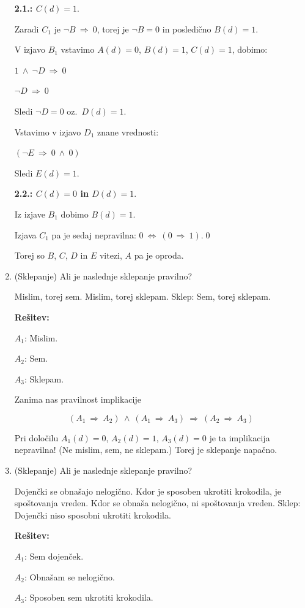 \documentclass[11pt,paper=b5,footinclude,headinclude]{scrbook} %
\def\inn {{~\wedge~}}
\def\sledi {{~\Rightarrow~}}
\def\cee {{~\Leftrightarrow~}}
\theoremstyle{remark}
\theoremstyle{definition} %
\theoremstyle{theorem} %
\begin{document}
\begin{enumerate}
\textbf{2.1.: $C(d) = 1$}.

Zaradi $C_1$ je $\neg B \sledi 0$, torej je $\neg B = 0$ in posledično $B(d) = 1$.

V izjavo $B_1$ vstavimo $A(d) = 0$, $B(d) = 1$, $C(d) = 1$, dobimo:

$1 \inn \neg D\sledi 0$

$\neg D\sledi 0$

Sledi $\neg D = 0$ oz.~$D(d) = 1$.

Vstavimo v izjavo $D_1$ znane vrednosti:

$(\neg E \sledi 0 \inn 0)$

Sledi $E(d) = 1$.

\bigskip

\textbf{2.2.: $C(d) = 0$ in $D(d) = 1$}.

Iz izjave $B_1$ dobimo $B(d) = 1$.

Izjava $C_1$ pa je sedaj nepravilna:
$0 \cee (0\sledi 1)$.\qed

Torej so $B$, $C$, $D$ in $E$ vitezi, $A$ pa je oproda.


\bigskip
\item (Sklepanje)
Ali je naslednje sklepanje pravilno?

Mislim, torej sem. Mislim, torej sklepam. Sklep: Sem, torej sklepam.


\textbf{Rešitev:}

$A_1$: Mislim.

$A_2$: Sem.

$A_3$: Sklepam.

Zanima nas pravilnost implikacije

$$(A_1\sledi A_2)\inn(A_1\sledi A_3)\sledi(A_2\sledi A_3)$$

Pri določilu $A_1(d) = 0$, $A_2(d) = 1$, $A_3(d) = 0$ je ta implikacija nepravilna!
(Ne mislim, sem, ne sklepam.)
Torej je sklepanje napačno.

\bigskip

\item (Sklepanje)
Ali je naslednje sklepanje pravilno?

Dojenčki se obnašajo nelogično. Kdor je sposoben ukrotiti krokodila, je spoštovanja vreden.
Kdor se obnaša nelogično, ni spoštovanja vreden. Sklep: Dojenčki niso sposobni ukrotiti krokodila.


\textbf{Rešitev:}

$A_1$: Sem dojenček.

$A_2$: Obnašam se nelogično.

$A_3$: Sposoben sem ukrotiti krokodila.


\end{enumerate}
\end{document}
